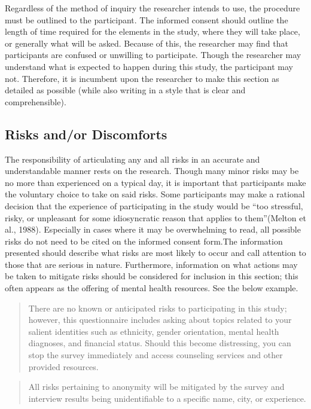 \documentclass[
  11pt,
]{book}
\begin{document}
Regardless of the method of inquiry the researcher intends to use, the procedure must be outlined to the participant. The informed consent should outline the length of time required for the elements in the study, where they will take place, or generally what will be asked. Because of this, the researcher may find that participants are confused or unwilling to participate. Though the researcher may understand what is expected to happen during this study, the participant may not. Therefore, it is incumbent upon the researcher to make this section as detailed as possible (while also writing in a style that is clear and comprehensible).

\subsection{Risks and/or Discomforts}\label{risks-andor-discomforts}

The responsibility of articulating any and all risks in an accurate and understandable manner rests on the research. Though many minor risks may be no more than experienced on a typical day, it is important that participants make the voluntary choice to take on said risks. Some participants may make a rational decision that the experience of participating in the study would be ``too stressful, risky, or unpleasant for some idiosyncratic reason that applies to them''(Melton et al., 1988). Especially in cases where it may be overwhelming to read, all possible risks do not need to be cited on the informed consent form.The information presented should describe what risks are most likely to occur and call attention to those that are serious in nature. Furthermore, information on what actions may be taken to mitigate risks should be considered for inclusion in this section; this often appears as the offering of mental health resources. See the below example.

\begin{quote}
There are no known or anticipated risks to participating in this study; however, this questionnaire includes asking about topics related to your salient identities such as ethnicity, gender orientation, mental health diagnoses, and financial status. Should this become distressing, you can stop the survey immediately and access counseling services and other provided resources.
\end{quote}

\begin{quote}
All risks pertaining to anonymity will be mitigated by the survey and interview results being unidentifiable to a specific name, city, or experience.
\end{quote}
\end{document}
